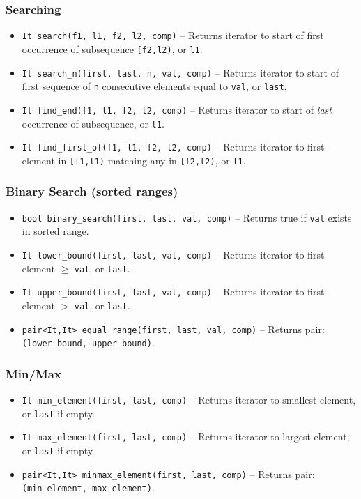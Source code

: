\subsubsection{Searching}
\begin{itemize}
\item \texttt{It search(f1, l1, f2, l2, comp)} -- Returns iterator to start of first occurrence of subsequence \texttt{[f2,l2)}, or \texttt{l1}.
\item \texttt{It search\_n(first, last, n, val, comp)} -- Returns iterator to start of first sequence of \texttt{n} consecutive elements equal to \texttt{val}, or \texttt{last}.
\item \texttt{It find\_end(f1, l1, f2, l2, comp)} -- Returns iterator to start of \textit{last} occurrence of subsequence, or \texttt{l1}.
\item \texttt{It find\_first\_of(f1, l1, f2, l2, comp)} -- Returns iterator to first element in \texttt{[f1,l1)} matching any in \texttt{[f2,l2)}, or \texttt{l1}.
\end{itemize}

\subsubsection{Binary Search (sorted ranges)}
\begin{itemize}
\item \texttt{bool binary\_search(first, last, val, comp)} -- Returns true if \texttt{val} exists in sorted range.
\item \texttt{It lower\_bound(first, last, val, comp)} -- Returns iterator to first element $\geq$ \texttt{val}, or \texttt{last}.
\item \texttt{It upper\_bound(first, last, val, comp)} -- Returns iterator to first element $>$ \texttt{val}, or \texttt{last}.
\item \texttt{pair<It,It> equal\_range(first, last, val, comp)} -- Returns pair: \texttt{(lower\_bound, upper\_bound)}.
\end{itemize}

\subsubsection{Min/Max}
\begin{itemize}
\item \texttt{It min\_element(first, last, comp)} -- Returns iterator to smallest element, or \texttt{last} if empty.
\item \texttt{It max\_element(first, last, comp)} -- Returns iterator to largest element, or \texttt{last} if empty.
\item \texttt{pair<It,It> minmax\_element(first, last, comp)} -- Returns pair: \texttt{(min\_element, max\_element)}.
\end{itemize}

